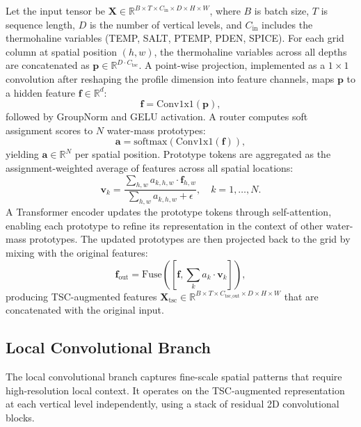\documentclass[conference]{IEEEtran}
\begin{document}
Let the input tensor be $\mathbf{X} \in \mathbb{R}^{B \times T \times C_{\text{in}} \times D \times H \times W}$, where $B$ is batch size, $T$ is sequence length, $D$ is the number of vertical levels, and $C_{\text{in}}$ includes the thermohaline variables (TEMP, SALT, PTEMP, PDEN, SPICE). For each grid column at spatial position $(h,w)$, the thermohaline variables across all depths are concatenated as $\mathbf{p} \in \mathbb{R}^{D \cdot C_{\text{tsc}}}$. A point-wise projection, implemented as a $1\times 1$ convolution after reshaping the profile dimension into feature channels, maps $\mathbf{p}$ to a hidden feature $\mathbf{f} \in \mathbb{R}^{d}$:
\begin{equation}
\mathbf{f} = \text{Conv1x1}(\mathbf{p}),
\end{equation}
followed by GroupNorm and GELU activation. A router computes soft assignment scores to $N$ water-mass prototypes:
\begin{equation}
\mathbf{a} = \text{softmax}(\text{Conv1x1}(\mathbf{f})),
\end{equation}
yielding $\mathbf{a} \in \mathbb{R}^{N}$ per spatial position. Prototype tokens are aggregated as the assignment-weighted average of features across all spatial locations:
\begin{equation}
\mathbf{v}_k = \frac{\sum_{h,w} a_{k,h,w} \cdot \mathbf{f}_{h,w}}{\sum_{h,w} a_{k,h,w} + \epsilon},\quad k = 1,\ldots,N.
\end{equation}
A Transformer encoder updates the prototype tokens through self-attention, enabling each prototype to refine its representation in the context of other water-mass prototypes. The updated prototypes are then projected back to the grid by mixing with the original features:
\begin{equation}
\mathbf{f}_{\text{out}} = \text{Fuse}([\mathbf{f}, \sum_k a_k \cdot \mathbf{v}_k]),
\end{equation}
producing TSC-augmented features $\mathbf{X}_{\text{tsc}} \in \mathbb{R}^{B \times T \times C_{\text{tsc\_out}} \times D \times H \times W}$ that are concatenated with the original input.

\subsection{Local Convolutional Branch}

The local convolutional branch captures fine-scale spatial patterns that require high-resolution local context. It operates on the TSC-augmented representation at each vertical level independently, using a stack of residual 2D convolutional blocks.
\end{document}
